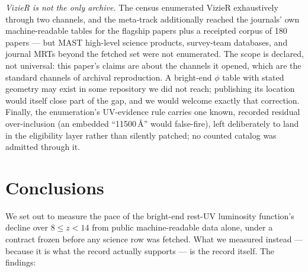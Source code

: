 \documentclass[twocolumn]{aastex702}
\begin{document}
\emph{VizieR is not the only archive.} The census enumerated VizieR exhaustively through
two channels, and the meta-track additionally reached the journals' own machine-readable
tables for the flagship papers plus a receipted corpus of 180 papers --- but MAST
high-level science products, survey-team databases, and journal MRTs beyond the fetched
set were not enumerated. The scope is declared, not universal: this paper's claims are
about the channels it opened, which are the standard channels of archival reproduction.
A bright-end $\phi$ table with stated geometry may exist in some repository we did not
reach; publishing its location would itself close part of the gap, and we would welcome
exactly that correction. Finally, the enumeration's UV-evidence rule carries one known,
recorded residual over-inclusion (an embedded ``11500\,\AA'' would false-fire), left
deliberately to land in the eligibility layer rather than silently patched; no counted
catalog was admitted through it.

\section{Conclusions} \label{sec:conclusions}

We set out to measure the pace of the bright-end rest-UV luminosity function's decline
over $8\le z<14$ from public machine-readable data alone, under a contract frozen before
any science row was fetched. What we measured instead --- because it is what the record
actually supports --- is the record itself. The findings:
\end{document}
